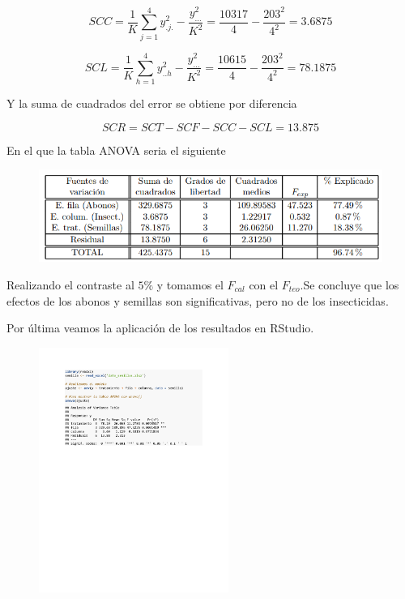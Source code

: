 $$
SCC  = \frac{1}{K}\sum_{j=1}^{4}{y}_{.j.}^{2} - \frac{{y}_{\ldots}^{2}}{K^2} = \frac{10317}{4} - \frac{203^2}{4^2} = 3.6875
$$

$$
SCL  = \frac{1}{K}\sum_{h=1}^{4}{y}_{..h}^{2} - \frac{{y}_{\ldots}^{2}}{K^2} = \frac{10615}{4} - \frac{203^2}{4^2} = 78.1875
$$

Y la suma de cuadrados del error se obtiene por diferencia

$$
SCR = SCT - SCF - SCC - SCL = 13.875
$$

En el que la tabla ANOVA seria el siguiente

\begin{figure}[H]
    \begin{tcolorbox}[colback=white, colframe=black, boxrule=1.5pt, sharp corners=all]
          \begin{center}
            {\includegraphics[scale=1]{images/img4.png}}
          \end{center}
        \end{tcolorbox}
\end{figure}

Realizando el contraste al $5\%$ y tomamos el $F_{cal}$ con el $F_{teo}$.Se concluye que los efectos de los abonos y semillas son significativas, pero no de los insecticidas.

Por última veamos la aplicación de los resultados en RStudio.

\begin{figure}[h!]
        \begin{tcolorbox}[colback=white, colframe=black, boxrule=1.5pt, sharp corners=all]
            {\includegraphics[width=\linewidth, height=8cm, trim=2.5cm 16cm 2.5cm 2.5cm, clip]{images/imgscript.pdf}}
        \end{tcolorbox}
\end{figure}
